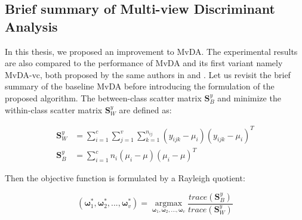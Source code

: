 
\subsection{Brief summary of Multi-view Discriminant Analysis}
    In this thesis, we proposed an improvement to MvDA.
    The experimental results are also compared to the performance of MvDA and its first variant namely MvDA-vc, both proposed by the same authors in \cite{kan2015multi} and \cite{kan2016multi}.
    Let us revisit the brief summary of the baseline MvDA before introducing the formulation of the proposed algorithm.
    The between-class scatter matrix $\boldsymbol{S}_B^y$ and minimize the within-class scatter matrix $\boldsymbol{S}_W^y$ are defined as: 

    \begin{align}
        \boldsymbol{S}_W^y &= \sum_{i=1}^{c}\sum_{j=1}^{v}\sum_{k=1}^{n_{ij}}(y_{ijk}-\mu_i)(y_{ijk}-\mu_i)^T \label{eq:MvDA_Sw}\\
        \boldsymbol{S}_B^y &= \sum_{i=1}^{c}n_i(\mu_i - \mu)(\mu_i - \mu)^T \label{eq:MvDA_Sb}
    \end{align}

    Then the objective function is formulated by a Rayleigh quotient:

    \begin{equation}
        (\boldsymbol{\omega}_1^*,\boldsymbol{\omega}_2^*, ..., \boldsymbol{\omega}_v^*) = \operatorname*{argmax}_{\boldsymbol{\omega}_1, \boldsymbol{\omega}_2,..., \boldsymbol{\omega}_v}\frac{trace(\boldsymbol{S}_B^y)}{trace(\boldsymbol{S}_W^y)}
    \end{equation}


